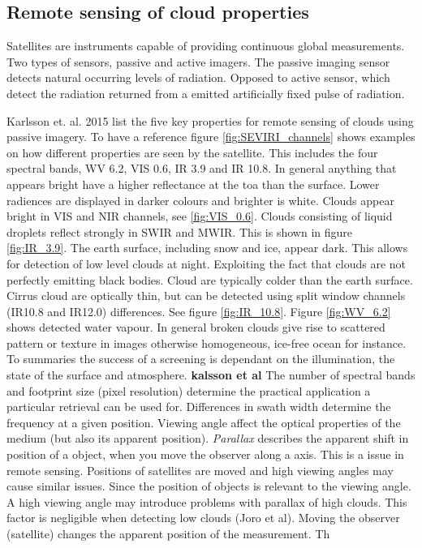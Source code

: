 \subsection{Remote sensing of cloud properties}
Satellites are instruments capable of providing continuous global measurements. Two types of sensors, passive and active imagers. The passive imaging sensor detects natural occurring levels of radiation. Opposed to active sensor, which detect the radiation returned from a emitted artificially fixed pulse of radiation.

Karlsson et. al. 2015 list the five key properties for remote sensing of clouds using passive imagery. To have a reference figure \ref{fig:SEVIRI_channels} shows examples on how different properties are seen by the satellite. This includes the four spectral bands, WV 6.2, VIS 0.6, IR 3.9 and IR 10.8. In general anything that appears bright have a higher reflectance at the \acrfull{toa} than the surface. Lower radiences are displayed in darker colours and brighter is white. Clouds appear bright in VIS and NIR channels, see \ref{fig:VIS_0.6}. Clouds consisting of liquid droplets reflect strongly in SWIR and MWIR. This is shown in figure \ref{fig:IR_3.9}. The earth surface, including snow and ice, appear dark. This allows for detection of low level clouds at night. Exploiting the fact that clouds are not perfectly emitting black bodies. Cloud are typically colder than the earth surface. Cirrus cloud are optically thin, but can be detected using split window channels (IR10.8 and IR12.0) differences. See figure \ref{fig:IR_10.8}. Figure \ref{fig:WV_6.2} shows detected water vapour. In general broken clouds give rise to scattered pattern or texture in images otherwise homogeneous, ice-free ocean for instance. To summaries the success of a screening is dependant on the illumination, the state of the surface and atmosphere. \textbf{kalsson et al} The number of spectral bands and footprint size (pixel resolution) determine the practical application a particular retrieval can be used for. Differences in swath width determine the frequency at a given position. Viewing angle affect the optical properties of the medium (but also its apparent position). \textit{Parallax} describes the apparent shift in position of a object, when you move the observer along a axis. This is a issue in remote sensing. Positions of satellites are moved and high viewing angles may cause similar issues. Since the position of objects is relevant to the viewing angle. A high viewing angle may introduce problems with parallax of high clouds. This factor is negligible when detecting low clouds (Joro et al). Moving the observer (satellite) changes the apparent position of the measurement. Th

